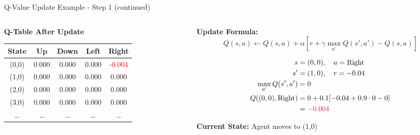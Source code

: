 \documentclass[aspectratio=169]{beamer}
\begin{document}
\begin{frame}{Q-Value Update Example - Step 1 (continued)}
\begin{columns}
\begin{column}{0.5\textwidth}
            \textbf{Q-Table After Update}
            \small
            \begin{table}[h]
                \centering
                \begin{tabular}{|c|c|c|c|c|}
                    \hline
                    \textbf{State} & \textbf{Up} & \textbf{Down} & \textbf{Left} & \textbf{Right} \\
                    \hline
                    (0,0) & 0.000 & 0.000 & 0.000 & \textcolor{red}{-0.004} \\
                    (1,0) & 0.000 & 0.000 & 0.000 & 0.000 \\
                    (2,0) & 0.000 & 0.000 & 0.000 & 0.000 \\
                    (3,0) & 0.000 & 0.000 & 0.000 & 0.000 \\
                    \dots & \dots & \dots & \dots & \dots \\
                    \hline
                \end{tabular}
            \end{table}
        \end{column}
        
        \begin{column}{0.5\textwidth}
            \textbf{Update Formula:}
            $$Q(s,a) \leftarrow Q(s,a) + \alpha[r + \gamma \max_{a'}Q(s',a') - Q(s,a)]$$
            
          
            \begin{align}
                s &= (0,0), \quad a = \text{Right} \\
                s' &= (1,0), \quad r = -0.04 \\
                \max_{a'}Q(s',a') &= 0 \\
                Q((0,0),\text{Right}) &= 0 + 0.1[-0.04 + 0.9 \cdot 0 - 0] \\
                &= \textcolor{red}{-0.004}
            \end{align}
            
           
            \textbf{Current State:} Agent moves to (1,0)
        \end{column}
    \end{columns}
\end{frame}
\end{document}
